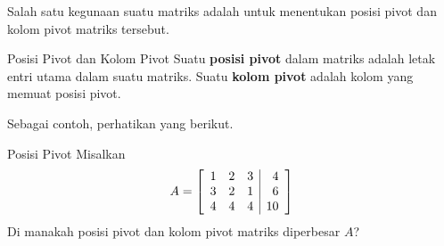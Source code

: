Salah satu kegunaan \ef \;suatu matriks adalah untuk menentukan posisi pivot dan kolom pivot matriks tersebut.

\begin{definition}{Posisi Pivot dan Kolom Pivot}\label{def:pivotpositionandcolumn}
Suatu \textbf{posisi pivot}
dalam matriks adalah letak entri utama dalam \ef{} suatu matriks.
Suatu \textbf{kolom pivot}
 adalah kolom yang memuat posisi pivot.
\end{definition}

Sebagai contoh, perhatikan yang berikut.

\begin{example}{Posisi Pivot}\label{exa:pivotposition}
Misalkan
\begin{equation*}
A=\left[
\begin{array}{rrr|r}
1 & 2 & 3 & 4 \\
3 & 2 & 1 & 6 \\
4 & 4 & 4 & 10
\end{array}
\right]
\end{equation*}
Di manakah posisi pivot
dan kolom pivot matriks diperbesar $A$?
\end{example}

